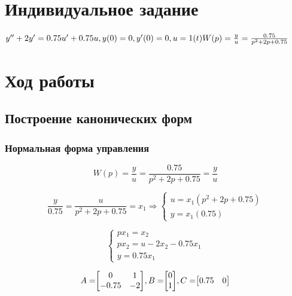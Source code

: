 \documentclass[14pt,a4paper,report]{report}
\begin{document}
\section{Индивидуальное задание}

$
\\
y''+2y'=0.75u'+0.75u, y(0)=0, y'(0)=0, u=1(t)\\\\
W(p)=\frac{y}{u}=\frac{0.75}{p^2+2p+0.75}
$

\newpage
\section{Ход работы}

\subsection{Построение канонических форм}

\subsubsection{Нормальная форма управления}

\begin{equation*}
\text{$W(p)=\frac{y}{u}=\frac{0.75}{p^2+2p+0.75}=\frac{y}{u}$}
\end{equation*}

\begin{equation*}
\text{$\frac{y}{0.75}=\frac{u}{p^2+2p+0.75}=x_1$}
\Longrightarrow
\begin{cases}
	\text{$u=x_1(p^2+2p+0.75)$} \\
	\text{$y=x_1(0.75)$}
\end{cases}
\end{equation*}

\begin{equation*}
\begin{cases}
	\text{$px_1=x_2$} \\
	\text{$px_2=u-2x_2-0.75x_1$}\\
	\text{$y=0.75x_1$}
\end{cases}
\end{equation*}

\begin{equation*}
\text{$A=$}
\text{$
\begin{bmatrix}
0 & 1 \\
-0.75 & -2 \\
\end{bmatrix}
$}
\text{$, B=$}
\text{$
\begin{bmatrix}
0 \\
1 \\
\end{bmatrix}
$}
\text{$, C=$}
\text{$
\begin{bmatrix}
0.75 & 0 \\
\end{bmatrix}
$}
\end{equation*}
\end{document}
